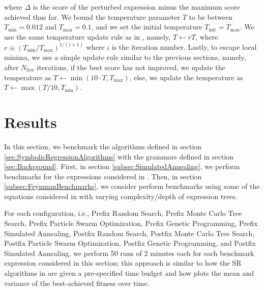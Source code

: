 \documentclass[12pt]{iopart}
\begin{document}
where $\Delta$ is the score of the perturbed expression minus the maximum score achieved thus far. We bound the temperature parameter $T$ to be between $T_{\mathrm{min}} = 0.012$ and $T_{\mathrm{max}} = 0.1$, and we set the initial temperature $T_{\mathrm{init}} = T_{\mathrm{max}}$. We use the same temperature update rule as in \cite{10.1145/3449639.3459345}, namely, $T \gets rT$, where $r \equiv \left(T_{\mathrm{min}}/T_{\mathrm{max}}\right)^{1/(i+1)}$ where $i$ is the iteration number. Lastly, to escape local minima, we use a simple update rule similar to the previous sections, namely, after $N_{\mathrm{iter}}$ iterations, if the best score has not improved, we update the temperature as $T \gets \min{\left(10\cdot T, T_{\mathrm{max}}\right)}$, else, we update the temperature as $T \gets \max{\left(T/10, T_{\mathrm{min}}\right)}$.

\section{Results}\label{sec:Results}
In this section, we benchmark the algorithms defined in section \ref{sec:SymbolicRegressionAlgorithms} with the grammars defined in section \ref{sec:Background}. First, in section \ref{subsec:SimulatedAnnealing}, we perform benchmarks for the expressions considered in \cite{hemberg2008pre}. Then, in section \ref{subsec:FeynmanBenchmarks}, we consider perform benchmarks using some of the equations considered in \cite{udrescu2020ai} with varying complexity/depth of expression trees.
\par For each configuration, i.e., Prefix Random Search, Prefix Monte Carlo Tree Search, Prefix Particle Swarm Optimization, Prefix Genetic Programming,  Prefix Simulated Annealing, Postfix Random Search, Postfix Monte Carlo Tree Search, Postfix Particle Swarm Optimization, Postfix Genetic Programming, and Postfix Simulated Annealing, we perform 50 runs of 2 minutes each for each benchmark expression considered in this section; this approach is similar to how the SR algorithms in \cite{defranca2023interpretable} are given a pre-specified time budget and how \cite{manti2023discovering} plots the mean and variance of the best-achieved fitness over time.
\end{document}
